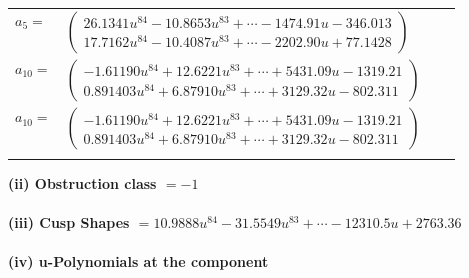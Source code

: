 \documentclass[1p]{elsarticle_modified}
\theoremstyle{definition}
\begin{document}
\begin{tabular}{m{7pt} m{180pt} m{7pt} m{180pt} }
\flushright $a_{5}=$&$\begin{pmatrix}26.1341 u^{84}-10.8653 u^{83}+\cdots-1474.91 u-346.013\\17.7162 u^{84}-10.4087 u^{83}+\cdots-2202.90 u+77.1428\end{pmatrix}$ \\
\flushright $a_{10}=$&$\begin{pmatrix}-1.61190 u^{84}+12.6221 u^{83}+\cdots+5431.09 u-1319.21\\0.891403 u^{84}+6.87910 u^{83}+\cdots+3129.32 u-802.311\end{pmatrix}$\\ \flushright $a_{10}=$&$\begin{pmatrix}-1.61190 u^{84}+12.6221 u^{83}+\cdots+5431.09 u-1319.21\\0.891403 u^{84}+6.87910 u^{83}+\cdots+3129.32 u-802.311\end{pmatrix}$\\&\end{tabular}
\flushleft \textbf{(ii) Obstruction class $= -1$}\\~\\
\flushleft \textbf{(iii) Cusp Shapes $= 10.9888 u^{84}-31.5549 u^{83}+\cdots-12310.5 u+2763.36$}\\~\\
\newpage\renewcommand{\arraystretch}{1}
\flushleft \textbf{(iv) u-Polynomials at the component}\newline \\
\end{document}
